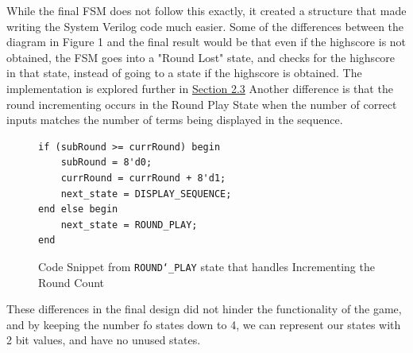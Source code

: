\documentclass{report}
\begin{document}
While the final FSM does not follow this exactly, it created a structure that made writing the System Verilog code much easier. Some of the differences between the diagram in Figure 1 and the final result would be that even if the highscore is not obtained, the FSM goes into a "Round Lost" state, and checks for the highscore in that state, instead of going to a state if the highscore is obtained. The implementation is explored further in \hyperlink{round_lost}{Section 2.3} \newline
\newline
Another difference is that the round incrementing occurs in the Round Play State when the number of correct inputs matches the number of terms being displayed in the sequence.
\begin{figure}[H]
\begin{verbatim}
if (subRound >= currRound) begin
    subRound = 8'd0;
    currRound = currRound + 8'd1;
    next_state = DISPLAY_SEQUENCE;
end else begin
    next_state = ROUND_PLAY;
end
\end{verbatim}
\caption{Code Snippet from \texttt{ROUND\char`_PLAY} state that handles Incrementing the Round Count}
\end{figure}
These differences in the final design did not hinder the functionality of the game, and by keeping the number fo states down to 4, we can represent our states with 2 bit values, and have no unused states.   
\newpage
\end{document}
